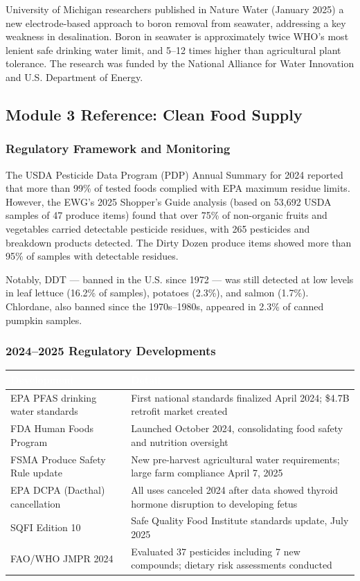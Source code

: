 \documentclass[11pt,letterpaper]{article}
\newcommand{\tableheader}[1]{\textbf{\sffamily\textcolor{white}{#1}}}
\begin{document}
University of Michigan researchers published in Nature Water (January 2025) a new electrode-based approach to boron removal from seawater, addressing a key weakness in desalination. Boron in seawater is approximately twice WHO's most lenient safe drinking water limit, and 5--12 times higher than agricultural plant tolerance. The research was funded by the National Alliance for Water Innovation and U.S. Department of Energy.

\subsection{Module 3 Reference: Clean Food Supply}

\subsubsection{Regulatory Framework and Monitoring}

The USDA Pesticide Data Program (PDP) Annual Summary for 2024 reported that more than 99\% of tested foods complied with EPA maximum residue limits. However, the EWG's 2025 Shopper's Guide analysis (based on 53,692 USDA samples of 47 produce items) found that over 75\% of non-organic fruits and vegetables carried detectable pesticide residues, with 265 pesticides and breakdown products detected. The Dirty Dozen produce items showed more than 95\% of samples with detectable residues.

Notably, DDT --- banned in the U.S. since 1972 --- was still detected at low levels in leaf lettuce (16.2\% of samples), potatoes (2.3\%), and salmon (1.7\%). Chlordane, also banned since the 1970s--1980s, appeared in 2.3\% of canned pumpkin samples.

\subsubsection{2024--2025 Regulatory Developments}

\begin{center}
\begin{tabularx}{\textwidth}{L{4cm}X}
\toprule
{}
\tableheader{Development} & \tableheader{Detail} \\
\midrule
EPA PFAS drinking water standards & First national standards finalized April 2024; \$4.7B retrofit market created \\
FDA Human Foods Program & Launched October 2024, consolidating food safety and nutrition oversight \\
FSMA Produce Safety Rule update & New pre-harvest agricultural water requirements; large farm compliance April 7, 2025 \\
EPA DCPA (Dacthal) cancellation & All uses canceled 2024 after data showed thyroid hormone disruption to developing fetus \\
SQFI Edition 10 & Safe Quality Food Institute standards update, July 2025 \\
FAO/WHO JMPR 2024 & Evaluated 37 pesticides including 7 new compounds; dietary risk assessments conducted \\
\bottomrule
\end{tabularx}
\end{center}
\end{document}
